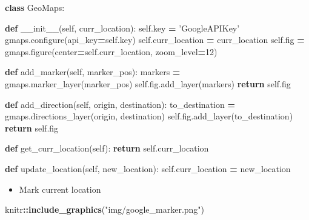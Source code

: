 \documentclass[]{book}
\newenvironment{Shaded}{\begin{snugshade}}{\end{snugshade}}
\newcommand{\ControlFlowTok}[1]{\textcolor[rgb]{0.13,0.29,0.53}{\textbf{#1}}}
\newcommand{\DecValTok}[1]{\textcolor[rgb]{0.00,0.00,0.81}{#1}}
\newcommand{\FunctionTok}[1]{\textcolor[rgb]{0.00,0.00,0.00}{#1}}
\newcommand{\KeywordTok}[1]{\textcolor[rgb]{0.13,0.29,0.53}{\textbf{#1}}}
\newcommand{\NormalTok}[1]{#1}
\newcommand{\OperatorTok}[1]{\textcolor[rgb]{0.81,0.36,0.00}{\textbf{#1}}}
\newcommand{\StringTok}[1]{\textcolor[rgb]{0.31,0.60,0.02}{#1}}
\newcommand{\VariableTok}[1]{\textcolor[rgb]{0.00,0.00,0.00}{#1}}
\providecommand{\tightlist}{%
  \setlength{\itemsep}{0pt}\setlength{\parskip}{0pt}}
\begin{document}
\begin{Shaded}
\begin{Highlighting}[]
\KeywordTok{class}\NormalTok{ GeoMaps:}
    
    \KeywordTok{def} \FunctionTok{__init__}\NormalTok{(}\VariableTok{self}\NormalTok{, curr_location):}
        \VariableTok{self}\NormalTok{.key }\OperatorTok{=} \StringTok{'GoogleAPIKey'}
\NormalTok{        gmaps.configure(api_key}\OperatorTok{=}\VariableTok{self}\NormalTok{.key)}
        \VariableTok{self}\NormalTok{.curr_location }\OperatorTok{=}\NormalTok{ curr_location}
        \VariableTok{self}\NormalTok{.fig }\OperatorTok{=}\NormalTok{ gmaps.figure(center}\OperatorTok{=}\VariableTok{self}\NormalTok{.curr_location, zoom_level}\OperatorTok{=}\DecValTok{12}\NormalTok{)}
        
    \KeywordTok{def}\NormalTok{ add_marker(}\VariableTok{self}\NormalTok{, marker_pos):}
\NormalTok{        markers }\OperatorTok{=}\NormalTok{ gmaps.marker_layer(marker_pos)}
        \VariableTok{self}\NormalTok{.fig.add_layer(markers)}
        \ControlFlowTok{return} \VariableTok{self}\NormalTok{.fig}
    
    \KeywordTok{def}\NormalTok{ add_direction(}\VariableTok{self}\NormalTok{, origin, destination):}
\NormalTok{        to_destination }\OperatorTok{=}\NormalTok{ gmaps.directions_layer(origin, destination)}
        \VariableTok{self}\NormalTok{.fig.add_layer(to_destination)}
        \ControlFlowTok{return} \VariableTok{self}\NormalTok{.fig}
    
    \KeywordTok{def}\NormalTok{ get_curr_location(}\VariableTok{self}\NormalTok{):}
        \ControlFlowTok{return} \VariableTok{self}\NormalTok{.curr_location}
    
    \KeywordTok{def}\NormalTok{ update_location(}\VariableTok{self}\NormalTok{, new_location):}
        \VariableTok{self}\NormalTok{.curr_location }\OperatorTok{=}\NormalTok{ new_location}
\end{Highlighting}
\end{Shaded}

\begin{itemize}
\tightlist
\item
  Mark current location
\end{itemize}

\begin{Shaded}
\begin{Highlighting}[]
\NormalTok{knitr}\OperatorTok{::}\KeywordTok{include_graphics}\NormalTok{(}\StringTok{"img/google_marker.png"}\NormalTok{)}
\end{Highlighting}
\end{Shaded}
\end{document}
